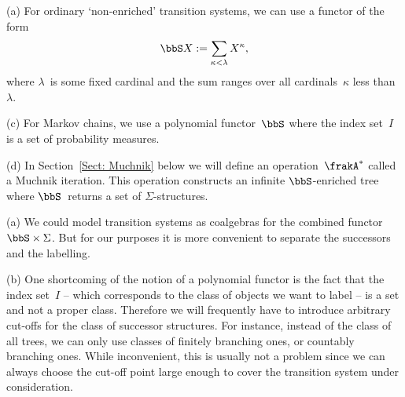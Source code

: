 \documentclass[10pt, fleqn]{scrartcl}
\newcommand*{\?}{\kern .08em}
\begin{document}
\begin{Exams}
(a) For ordinary `non-enriched' transition systems, we can use a functor of the form
\begin{align*}
  \bbS X := \sum_{\kappa < \lambda} X^\kappa,
\end{align*}
where $\lambda$~is some fixed cardinal and the sum ranges over all cardinals~$\kappa$
less than~$\lambda$.

(c) For Markov chains, we use a polynomial functor~$\bbS$ where the index set~$I$ is a
set of probability measures.

(d) In Section~\ref{Sect: Muchnik} below we will define an operation~$\frakA^*$ called
a Muchnik iteration. This operation constructs an infinite $\bbS$-enriched tree where
$\bbS$~returns a set of $\Sigma$-structures.
\end{Exams}

\begin{Rem}
(a)
We could model transition systems as coalgebras for the combined functor $\bbS \times \Sigma$.
But for our purposes it is more convenient to separate the successors and the labelling.

(b)
One shortcoming of the notion of a polynomial functor is the fact that the index set~$I$ --
which corresponds to the class of objects we want to label -- is a set and not a proper class.
Therefore we will frequently have to introduce arbitrary cut-offs for the class
of successor structures. For instance, instead of the class of all trees,
we can only use classes of finitely branching ones, or countably branching ones.
While inconvenient, this is usually not a problem since we can always choose the cut-off point
large enough to cover the transition system under consideration.
\end{Rem}
\end{document}
